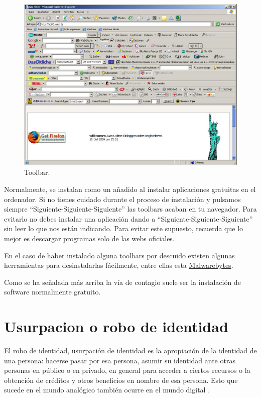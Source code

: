 \documentclass[
  spanish,
  a4paper,
  openany]{book}
\begin{document}
\begin{figure}

{\centering \includegraphics[width=0.75\linewidth]{images/toolbar} 

}

\caption{Toolbar.}\label{fig:unnamed-chunk-17}
\end{figure}

Normalmente, se instalan como un añadido al instalar aplicaciones gratuitas en el ordenador. Si no tienes cuidado durante el proceso de instalación y pulsamos siempre ``Siguiente-Siguiente-Siguiente'' las toolbars acaban en tu navegador. Para evitarlo no debes instalar una aplicación dando a ``Siguiente-Siguiente-Siguiente'' sin leer lo que nos están indicando. Para evitar este supuesto, recuerda que lo mejor es descargar programas solo de las webs oficiales.

En el caso de haber instalado alguna toolbars por descuido existen algunas herramientas para desinstalarlas fácilmente, entre ellas esta \href{https://es.malwarebytes.com/adwcleaner/}{Malwarebytes}.

Como se ha señalada más arriba la vía de contagio suele ser la instalación de software normalmente gratuito.

\hypertarget{usurpacion-o-robo-de-identidad}{%
\section{Usurpacion o robo de identidad}\label{usurpacion-o-robo-de-identidad}}

El robo de identidad, usurpación de identidad es la apropiación de la identidad de una persona: hacerse pasar por esa persona, asumir su identidad ante otras personas en público o en privado, en general para acceder a ciertos recursos o la obtención de créditos y otros beneficios en nombre de esa persona. Esto que sucede en el mundo analógico también ocurre en el mundo digital \citep{WIKI-usurpacion}.
\end{document}
